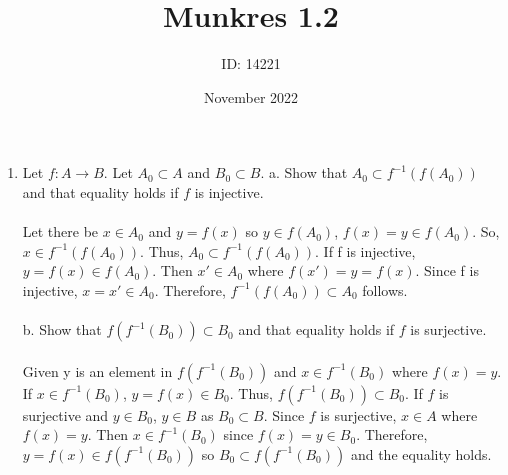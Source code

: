\documentclass[]{article}
\date{November 2022}
\author{ID: 14221}
\title{Munkres 1.2}
\begin{document}
\maketitle

\begin{enumerate}
    \item  Let $f: A \rightarrow B$. Let $A_0 \subset A$ and $B_0 \subset B$.
    \newline a. Show that $A_0 \subset f^{-1}(f(A_0))$ and that equality holds if $f$ is injective.
    \\\\ Let there be $x \in A_0$ and $y=f(x)$ so $y \in f(A_0)$, $f(x)=y \in f(A_0)$. So, $x \in f^{-1}(f(A_0))$. Thus, $A_0 \subset f^{-1}(f(A_0))$. If f is injective, $y=f(x) \in f(A_0)$. Then $x' \in A_0$ where $f(x')=y=f(x)$. Since f is injective, $x=x' \in A_0$. Therefore, $f^{-1}(f(A_0)) \subset A_0$ follows.
    \\\\ b. Show that $f(f^{-1}(B_0)) \subset B_0$ and that equality holds if $f$ is surjective.
    \\\\ Given y is an element in $f(f^{-1}(B_0))$ and $x \in f^{-1}(B_0)$ where $f(x)=y$. If $x \in f^{-1}(B_0)$, $y=f(x) \in B_0$. Thus, $f(f^{-1}(B_0)) \subset B_0$. If $f$ is surjective and $y \in B_0$, $y \in B$ as $B_0 \subset B$. Since $f$ is surjective, $x \in A$ where $f(x)=y$. Then $x \in f^{-1}(B_0)$ since $f(x)=y \in B_0$. Therefore, $y=f(x) \in f(f^{-1}(B_0))$ so $B_0 \subset f(f^{-1}(B_0))$ and the equality holds.
    

\end{enumerate}
\end{document}
